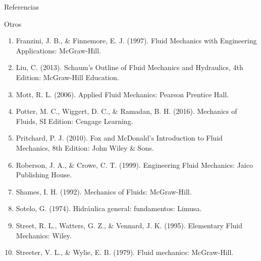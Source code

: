\documentclass [xcolor=svgnames, t] {beamer}
\begin{document}
\begin{frame}{Referencias}
\begin{block}{Otros}
\begin{enumerate}
\small
\item Franzini, J. B., \& Finnemore, E. J. (1997). Fluid Mechanics with Engineering Applications: McGraw-Hill.
\item Liu, C. (2013). Schaum’s Outline of Fluid Mechanics and Hydraulics, 4th Edition: McGraw-Hill Education.
\item Mott, R. L. (2006). Applied Fluid Mechanics: Pearson Prentice Hall.
\item Potter, M. C., Wiggert, D. C., \& Ramadan, B. H. (2016). Mechanics of Fluids, SI Edition: Cengage Learning.
\item Pritchard, P. J. (2010). Fox and McDonald's Introduction to Fluid Mechanics, 8th Edition: John Wiley \& Sons.
\item Roberson, J. A., \& Crowe, C. T. (1999). Engineering Fluid Mechanics: Jaico Publishing House.
\item Shames, I. H. (1992). Mechanics of Fluids: McGraw-Hill.
\item Sotelo, G. (1974). Hidráulica general: fundamentos: Limusa.
\item Street, R. L., Watters, G. Z., \& Vennard, J. K. (1995). Elementary Fluid Mechanics: Wiley.
\item Streeter, V. L., \& Wylie, E. B. (1979). Fluid mechanics: McGraw-Hill.
\end{enumerate}
\end{block}
\end{frame}

               
%        
%        
\end{document}
